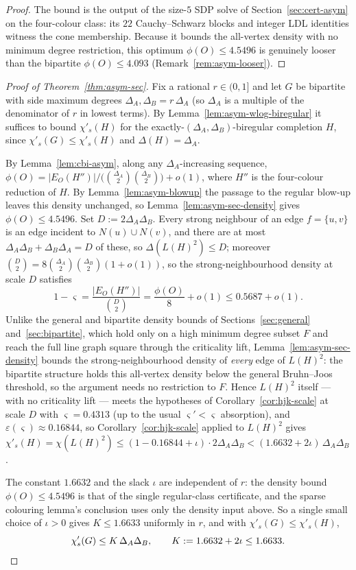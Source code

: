 \documentclass[11pt,a4paper]{article}
\theoremstyle{definition}
\theoremstyle{remark}
\begin{document}
\begin{proof}
The bound is the output of the size-$5$ SDP solve of
Section~\ref{sec:cert-asym} on the four-colour class: its $22$
Cauchy--Schwarz blocks and integer LDL identities witness the cone
membership. Because it bounds the all-vertex density with no
minimum degree restriction, this optimum $\phi(O) \leq 4.5496$ is
genuinely looser than the bipartite $\phi(O) \leq 4.093$
(Remark~\ref{rem:asym-looser}).
\end{proof}

\begin{proof}[Proof of Theorem~\ref{thm:asym-sec}]
Fix a rational $r \in (0, 1]$ and let $G$ be bipartite with side
maximum degrees $\Delta_A, \Delta_B = r\,\Delta_A$ (so $\Delta_A$ is
a multiple of the denominator of $r$ in lowest terms). By
Lemma~\ref{lem:asym-wlog-biregular} it suffices to bound $\chi'_s(H)$
for the exactly-$(\Delta_A, \Delta_B)$-biregular completion $H$, since
$\chi'_s(G) \leq \chi'_s(H)$ and $\Delta(H) = \Delta_A$.

By Lemma~\ref{lem:cbi-asym}, along any $\Delta_A$-increasing sequence,
$\phi(O) = |E_O(H'')| /
\bigl(\binom{\Delta_A}{2}\binom{\Delta_B}{2}\bigr) + o(1)$, where
$H''$ is the four-colour reduction of $H$. By
Lemma~\ref{lem:asym-blowup} the passage to the regular blow-up leaves
this density unchanged, so Lemma~\ref{lem:asym-sec-density} gives
$\phi(O) \leq 4.5496$. Set $D := 2\Delta_A\Delta_B$. Every strong
neighbour of an edge $f = \{u, v\}$ is an edge incident to
$N(u) \cup N(v)$, and there are at most
$\Delta_A\Delta_B + \Delta_B\Delta_A = D$ of these, so
$\Delta(L(H)^2) \leq D$; moreover $\binom{D}{2} =
8\binom{\Delta_A}{2}\binom{\Delta_B}{2}(1 + o(1))$, so the
strong-neighbourhood density at scale $D$ satisfies
\[
1 - \varsigma
= \frac{|E_O(H'')|}{\binom{D}{2}}
= \frac{\phi(O)}{8} + o(1)
\leq 0.5687 + o(1).
\]
Unlike the general and bipartite density bounds of
Sections~\ref{sec:general} and~\ref{sec:bipartite}, which hold only on
a high minimum degree subset $F$ and reach the full line graph square
through the criticality lift, Lemma~\ref{lem:asym-sec-density} bounds
the strong-neighbourhood density of \emph{every} edge of $L(H)^2$: the
bipartite structure holds this all-vertex density below the general
Bruhn--Joos threshold, so the argument needs no restriction to $F$.
Hence $L(H)^2$ itself --- with no criticality lift --- meets the
hypotheses of Corollary~\ref{cor:hjk-scale} at scale $D$ with
$\varsigma = 0.4313$
(up to the usual $\varsigma' < \varsigma$ absorption), and
$\varepsilon(\varsigma) \approx 0.16844$, so
Corollary~\ref{cor:hjk-scale} applied to $L(H)^2$ gives
$\chi'_s(H) = \chi(L(H)^2) \leq (1 - 0.16844 + \iota)\cdot
2\Delta_A\Delta_B < (1.6632 + 2\iota)\,\Delta_A \Delta_B$.

The constant $1.6632$ and the slack $\iota$ are independent of $r$:
the density bound $\phi(O) \leq 4.5496$ is that of the single
regular-class certificate, and the sparse colouring lemma's
conclusion uses only the density input above. So a single small choice
of $\iota > 0$ gives $K \leq 1.6633$ uniformly in $r$, and with
$\chi'_s(G) \leq \chi'_s(H)$,
\[
\chi'_s(G) \leq K\,\Delta_A \Delta_B,
\qquad
K := 1.6632 + 2\iota \leq 1.6633. \qedhere
\]
\end{proof}
\end{document}
